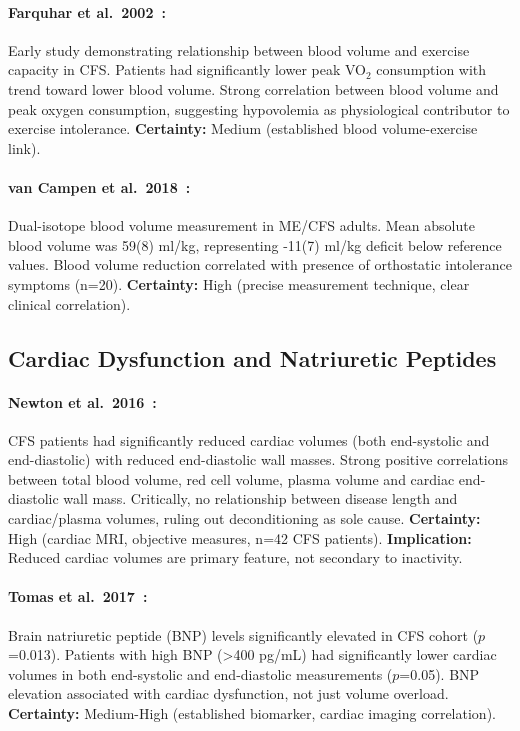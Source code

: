 \paragraph{Farquhar et al.\ 2002~\cite{Farquhar2002}:}
Early study demonstrating relationship between blood volume and exercise capacity in CFS. Patients had significantly lower peak VO$_2$ consumption with trend toward lower blood volume. Strong correlation between blood volume and peak oxygen consumption, suggesting hypovolemia as physiological contributor to exercise intolerance. \textbf{Certainty:} Medium (established blood volume-exercise link).

\paragraph{van Campen et al.\ 2018~\cite{vanCampen2018}:}
Dual-isotope blood volume measurement in ME/CFS adults. Mean absolute blood volume was 59(8) ml/kg, representing -11(7) ml/kg deficit below reference values. Blood volume reduction correlated with presence of orthostatic intolerance symptoms (n=20). \textbf{Certainty:} High (precise measurement technique, clear clinical correlation).

\subsection{Cardiac Dysfunction and Natriuretic Peptides}

\paragraph{Newton et al.\ 2016~\cite{Newton2016}:}
CFS patients had significantly reduced cardiac volumes (both end-systolic and end-diastolic) with reduced end-diastolic wall masses. Strong positive correlations between total blood volume, red cell volume, plasma volume and cardiac end-diastolic wall mass. Critically, no relationship between disease length and cardiac/plasma volumes, ruling out deconditioning as sole cause. \textbf{Certainty:} High (cardiac MRI, objective measures, n=42 CFS patients). \textbf{Implication:} Reduced cardiac volumes are primary feature, not secondary to inactivity.

\paragraph{Tomas et al.\ 2017~\cite{Tomas2017}:}
Brain natriuretic peptide (BNP) levels significantly elevated in CFS cohort ($p$=0.013). Patients with high BNP (>400 pg/mL) had significantly lower cardiac volumes in both end-systolic and end-diastolic measurements ($p$=0.05). BNP elevation associated with cardiac dysfunction, not just volume overload. \textbf{Certainty:} Medium-High (established biomarker, cardiac imaging correlation).

